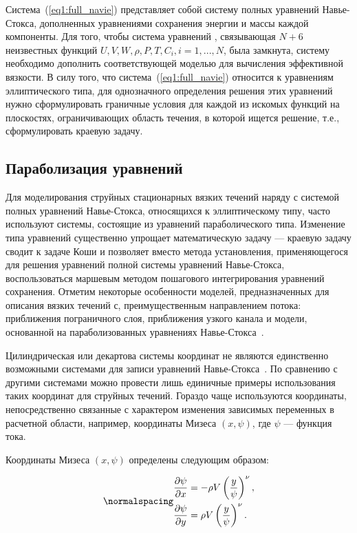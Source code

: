 Система~(\ref{eq1:full_navie}) представляет собой систему полных уравнений Навье-Стокса, дополненных уравнениями сохранения энергии и массы каждой компоненты. Для того, чтобы система уравнений , связывающая $N + 6$ неизвестных функций $U, V, W, \rho, P, T, C_i, i = 1,...,N$,  была замкнута, систему необходимо дополнить соответствующей моделью для вычисления эффективной вязкости. В силу того, что система~(\ref{eq1:full_navie}) относится к уравнениям эллиптического типа, для однозначного определения решения этих уравнений нужно сформулировать граничные условия для каждой из искомых функций на плоскостях, ограничивающих область течения, в которой ищется решение, т.е., сформулировать краевую задачу.

\subsection{Параболизация уравнений}

Для моделирования струйных стационарных вязких течений наряду с системой полных уравнений Навье-Стокса, относящихся к эллиптическому типу, часто используют системы, состоящие из уравнений параболического типа. Изменение типа уравнений существенно упрощает математическую задачу — краевую задачу сводит к задаче Коши и позволяет вместо метода установления, применяющегося для решения уравнений полной системы уравнений Навье-Стокса, воспользоваться маршевым методом пошагового интегрирования уравнений сохранения. Отметим некоторые особенности моделей, предназначенных для описания вязких течений с, преимущественным направлением потока: приближения пограничного слоя, приближения узкого канала и модели, основанной на параболизованных уравнениях Навье-Стокса~\cite{book16_tur, book17_tur, book18_tur, book19_tur, book20_tur, book21_tur}.

Цилиндрическая или декартова системы координат не являются единственно возможными системами для записи уравнений Навье-Стокса~\cite{book9_tur, book10_tur, book11_tur, book12_tur, book13_tur, book14_tur, book15_tur}. По сравнению с другими системами можно провести лишь единичные примеры использования таких координат для струйных течений. Гораздо чаще используются координаты, непосредственно связанные с характером изменения зависимых переменных в расчетной области, например, координаты Мизеса $(x, \psi)$, где $\psi$ — функция тока.

Координаты Мизеса $(x, \psi)$ определены следующим образом:

\begin{equation}
\normalspacing
\begin{split}
    \frac{\partial \psi}{\partial x} &= -\rho V\left(\frac{y}{\psi}\right)^\nu, \\
    \frac{\partial \psi}{\partial y} &= \rho V\left(\frac{y}{\psi}\right)^\nu.
\end{split}
\end{equation}

